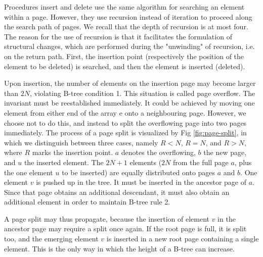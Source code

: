 Procedures insert and delete use the same algorithm for searching an element within a page.
However, they use recursion instead of iteration to proceed along the search path of pages. We
recall that the depth of recursion is at most four. The reason for the use of recursion is that it
facilitates the formulation of structural changes, which are performed during the "unwinding" of
recursion, i.e. on the return path. First, the insertion point (respectively the position of the element
to be deleted) is searched, and then the element is inserted (deleted).

Upon insertion, the number of elements on the insertion page may become larger than $2N$,
violating B-tree condition 1. This situation is called page overflow. The invariant must be
reestablished immediately. It could be achieved by moving one element from either end of the
array e onto a neighbouring page. However, we choose not to do this, and instead to split the
overflowing page into two pages immediately. The process of a page split is visualized by Fig \ref{fig:page-split},
in which we distinguish between three cases, namely $R < N$, $R = N$, and $R > N$, where $R$ marks
the insertion point. $a$ denotes the overflowing, $b$ the new page, and $u$ the inserted element.
The $2N + 1$ elements ($2N$ from the full page $a$, plus the one element $u$ to be inserted) are equally
distributed onto pages $a$ and $b$. One element $v$ is pushed up in the tree. It must be inserted in the
ancestor page of $a$. Since that page obtains an additional descendant, it must also obtain an
additional element in order to maintain B-tree rule 2.

A page split may thus propagate, because the insertion of element $v$ in the ancestor page may
require a split once again. If the root page is full, it is split too, and the emerging element $v$ is
inserted in a new root page containing a single element. This is the only way in which the height
of a B-tree can increase.

